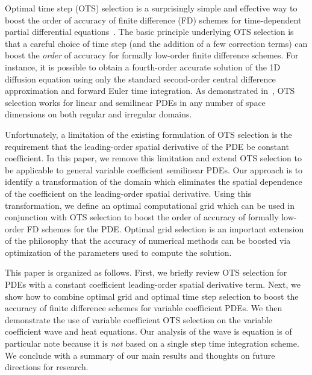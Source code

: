 \documentclass[twocolumn]{article} %
\makeatletter
\def\section{\@startsection {section}{1}{\z@}{1.0ex plus
1ex minus .2ex}{.2ex plus .2ex}{\large\bf}}
\makeatother
\begin{document}
\section{Introduction}
\label{Introduction}
Optimal time step (OTS) selection is a surprisingly simple and effective way to 
boost the order of accuracy of finite difference (FD) schemes for 
time-dependent partial differential equations~\cite{chu_otspde}.  The basic
principle underlying OTS selection is that a careful choice of time step (and 
the addition of a few correction terms) can boost the \emph{order} of 
accuracy for formally low-order finite difference schemes.  For instance, it 
is possible to obtain a fourth-order accurate solution of the 1D diffusion 
equation using only the standard second-order central difference approximation 
and forward Euler time integration.  As demonstrated in~\cite{chu_otspde}, OTS 
selection works for linear and semilinear PDEs in any number of space 
dimensions on both regular and irregular domains.  

Unfortunately, a limitation of the existing formulation of OTS selection is 
the requirement that the leading-order spatial derivative of the PDE be 
constant coefficient.  In this paper, we remove this limitation and extend OTS 
selection to be applicable to general variable coefficient semilinear PDEs.  
Our approach is to identify a transformation of the domain which 
eliminates the spatial dependence of the coefficient on the leading-order 
spatial derivative.  Using this transformation, we define an optimal 
computational grid which can be used in conjunction with OTS selection to 
boost the order of accuracy of formally low-order FD schemes for the PDE.  
Optimal grid selection is an important extension of the philosophy that the 
accuracy of numerical methods can be boosted via optimization of the 
parameters used to compute the solution.

This paper is organized as follows.  First, we briefly review OTS selection 
for PDEs with a constant coefficient leading-order spatial derivative term.  
Next, we show how to combine optimal grid and optimal time step selection to 
boost the accuracy of finite difference schemes for variable coefficient PDEs.  
We then demonstrate the use of variable coefficient OTS selection on the 
variable coefficient wave and heat equations.  Our analysis of the wave is 
equation is of particular note because it is \emph{not} based on a single step 
time integration scheme.  We conclude with a summary of our main results
and thoughts on future directions for research.
\end{document}
